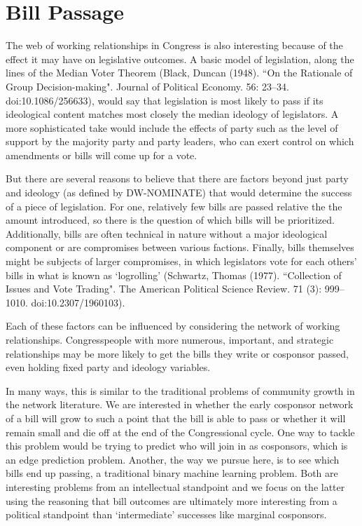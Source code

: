 \section{Bill Passage}

The web of working relationships in Congress is also interesting because of the
effect it may have on legislative outcomes. A basic model of legislation, along
the lines of the Median Voter Theorem (Black, Duncan (1948). ``On the Rationale
of Group Decision-making". Journal of Political Economy. 56: 23–34.
doi:10.1086/256633), would say that legislation is most likely to pass if its
ideological content matches most closely the median ideology of legislators. A
more sophisticated take would include the effects of party such as the level of
support by the majority party and party leaders, who can exert control on which
amendments or bills will come up for a vote.

But there are several reasons to believe that there are factors beyond just
party and ideology (as defined by DW-NOMINATE) that would determine the success
of a piece of legislation. For one, relatively few bills are passed relative the
the amount introduced, so there is the question of which bills will be
prioritized. Additionally, bills are often technical in nature without a major
ideological component or are compromises between various factions. Finally,
bills themselves might be subjects of larger compromises, in which legislators
vote for each others' bills in what is known as `logrolling' (Schwartz, Thomas
(1977). ``Collection of Issues and Vote Trading". The American Political Science
Review. 71 (3): 999–1010. doi:10.2307/1960103).

Each of these factors can be influenced by considering the network of working
relationships. Congresspeople with more numerous, important, and strategic
relationships may be more likely to get the bills they write or cosponsor
passed, even holding fixed party and ideology variables.

In many ways, this is similar to the traditional problems of community growth in
the network literature. We are interested in whether the early cosponsor network
of a bill will grow to such a point that the bill is able to pass or whether it
will remain small and die off at the end of the Congressional cycle. One way to
tackle this problem would be trying to predict who will join in as cosponsors,
which is an edge prediction problem. Another, the way we pursue here, is to see
which bills end up passing, a traditional binary machine learning problem. Both
are interesting problems from an intellectual standpoint and we focus on the
latter using the reasoning that bill outcomes are ultimately more interesting
from a political standpoint than `intermediate' successes like marginal
cosponsors.

